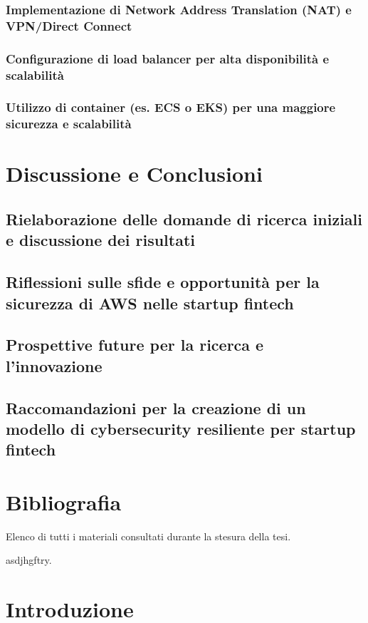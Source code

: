 \documentclass[a4paper,12pt]{report}
\begin{document}
\subsection{Implementazione di Network Address Translation (NAT) e VPN/Direct Connect}
\subsection{Configurazione di load balancer per alta disponibilità e scalabilità}
\subsection{Utilizzo di container (es. ECS o EKS) per una maggiore sicurezza e scalabilità}

\chapter{Discussione e Conclusioni}
\section{Rielaborazione delle domande di ricerca iniziali e discussione dei risultati}
\section{Riflessioni sulle sfide e opportunità per la sicurezza di AWS nelle startup fintech}
\section{Prospettive future per la ricerca e l'innovazione}
\section{Raccomandazioni per la creazione di un modello di cybersecurity resiliente per startup fintech}

\chapter*{Bibliografia}
Elenco di tutti i materiali consultati durante la stesura della tesi.


%
%
asdjhgftry.
\afterpreface
% 
% 
\chapter{Introduzione}
\label{cap1}
%
%
\end{document}
